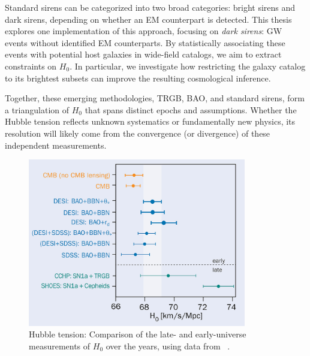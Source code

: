 \begin{itemize}
    Standard sirens can be categorized into two broad categories: bright sirens and dark sirens, depending on whether an \ac{EM} counterpart is detected. This thesis explores one implementation of this approach, focusing on \textit{dark sirens}: \ac{GW} events without identified \ac{EM} counterparts. By statistically associating these events with potential host galaxies in wide-field catalogs, we aim to extract constraints on $H_0$. In particular, we investigate how restricting the galaxy catalog to its brightest subsets can improve the resulting cosmological inference.
\end{itemize}

Together, these emerging methodologies, TRGB, BAO, and standard sirens, form a triangulation of $H_0$ that spans distinct epochs and assumptions. Whether the Hubble tension reflects unknown systematics or fundamentally new physics, its resolution will likely come from the convergence (or divergence) of these independent measurements.

\begin{figure}[h!]
    \centering
    \includegraphics[width=0.85\textwidth]{figures/CCMayJun24_NA_Astro_hubble.jpg}
    \caption[Hubble tension: late- vs. early-universe $H_0$ measurements.]{Hubble tension: Comparison of the late- and early-universe measurements of $H_0$ over the years, using data from \citet{adame2025desi}~\citep{cern2025}.}
    \label{fig:hubble_tension}
\end{figure}

